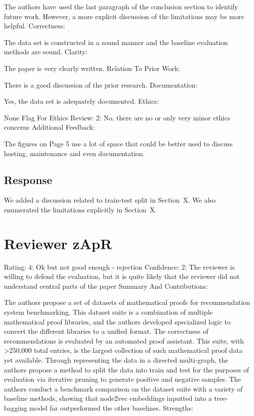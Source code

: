 \documentclass{article}
\begin{document}
The authors have used the last paragraph of the conclusion section to identify future work. However, a more explicit discussion of the limitations may be more helpful.
Correctness:

The data set is constructed in a sound manner and the baseline evaluation methods are sound.
Clarity:

The paper is very clearly written.
Relation To Prior Work:

There is a good discussion of the prior research.
Documentation:

Yes, the data set is adequately documented.
Ethics:

None
Flag For Ethics Review: 2: No, there are no or only very minor ethics concerns
Additional Feedback:

The figures on Page 5 use a lot of space that could be better used to discuss hosting, maintenance and even documentation.

\subsection{Response}

We added a discussion related to train-test split in Section~X. We also enumerated the limitations explicitly in Section~X.

\section{Reviewer zApR}

Rating: 4: Ok but not good enough - rejection
Confidence: 2: The reviewer is willing to defend the evaluation, but it is quite likely that the reviewer did not understand central parts of the paper
Summary And Contributions:

The authors propose a set of datasets of mathematical proofs for recommendation system benchmarking. This dataset suite is a combination of multiple mathematical proof libraries, and the authors developed specialized logic to convert the different libraries to a unified format. The correctness of recommendations is evaluated by an automated proof assistant. This suite, with >250,000 total entries, is the largest collection of such mathematical proof data yet available. Through representing the data in a directed multi-graph, the authors propose a method to split the data into train and test for the purposes of evaluation via iterative pruning to generate positive and negative samples. The authors conduct a benchmark comparison on the dataset suite with a variety of baseline methods, showing that node2vec embeddings inputted into a tree-bagging model far outperformed the other baselines.
Strengths:
\end{document}
